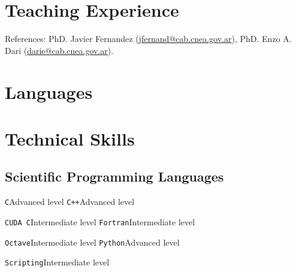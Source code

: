 \documentclass[11pt,a4paper,sans]{moderncv}        %
\begin{document}
\section{Teaching Experience}

{References: PhD. Javier Fernandez (\href{mailto:jfernand@cab.cnea.gov.ar}{jfernand@cab.cnea.gov.ar}), PhD. Enzo A. Dari (\href{mailto:darie@cab.cnea.gov.ar}{darie@cab.cnea.gov.ar}).}

\section{Languages}


\section{Technical Skills}

\subsection{Scientific Programming Languages}

\cvdoubleitem
{\texttt{C}}{Advanced level}
{\texttt{C++}}{Advanced level}

\cvdoubleitem
{\texttt{CUDA C}}{Intermediate level}
{\texttt{Fortran}}{Intermediate level}

\cvdoubleitem
{\texttt{Octave}}{Intermediate level} 
{\texttt{Python}}{Advanced level}

\cvitem
{\texttt{Scripting}}{Intermediate level}
\end{document}
